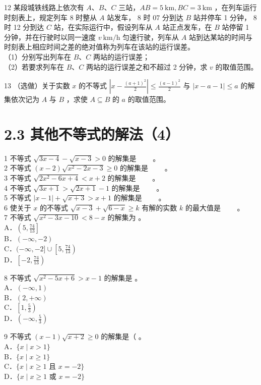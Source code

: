 \documentclass[10pt]{article}
\begin{document}
12 某段城铁线路上依次有 \(A 、 B 、 C\) 三站，\(A B=5 \mathrm{~km}, B C=3 \mathrm{~km}\) ，在列车运行时刻表上，规定列车 8 时整从 \(A\) 站发车， 8 时 07 分到达 \(B\) 站并停车 1 分钟， 8 时 12 分到达 \(C\) 站，在实际运行中，假设列车从 \(A\) 站正点发车，在 \(B\) 站停留 1 分钟，并在行驶时以同一速度 \(v \mathrm{~km} / \mathrm{h}\) 匀速行驶，列车从 \(A\) 站到达某站的时间与时刻表上相应时间之差的绝对值称为列车在该站的运行误差。\\
（1）分别写出列车在 \(B 、 C\) 两站的运行误差；\\
（2）若要求列车在 \(B 、 C\) 两站的运行误差之和不超过 2 分钟，求 \(v\) 的取值范围。

13 （选做）关于实数 \(x\) 的不等式 \(\left|x-\frac{(a+1)^{2}}{2}\right| \leqslant \frac{(a-1)^{2}}{2}\) 与 \(|x-a-1| \leqslant a\) 的解集依次记为 \(A\) 与 \(B\) ，求使 \(A \subseteq B\) 的 \(a\) 的取值范围。

\section*{2.3 其他不等式的解法（4）}
1 不等式 \(\sqrt{3 x-4}-\sqrt{x-3}>0\) 的解集是 \(\qquad\)。\\
2 不等式 \((x-2) \sqrt{x^{2}-2 x-3} \geqslant 0\) 的解集是 \(\qquad\)。\\
3 不等式 \(\sqrt{2 x^{2}-6 x+4}<x+2\) 的解集是 \(\qquad\)。\\
4 不等式 \(\sqrt{3 x+1}>\sqrt{2 x+1}-1\) 的解集是 \(\qquad\)。\\
5 不等式 \(|x-1|+\sqrt{x+3}>x+1\) 的解集是 \(\qquad\)。\\
6 使关于 \(x\) 的不等式 \(\sqrt{x-3}+\sqrt{6-x} \geqslant k\) 有解的实数 \(k\) 的最大值是 \(\qquad\)。\\
7 不等式 \(\sqrt{x^{2}-3 x-10}<8-x\) 的解集为 。\\
A．\(\left(5, \frac{74}{13}\right]\)\\
B．\((-\infty,-2)\)\\
C．\((-\infty,-2] \cup\left[5, \frac{74}{13}\right)\)\\
D．\(\left[-2, \frac{74}{13}\right)\)

8 不等式 \(\sqrt{x^{2}-5 x+6}>x-1\) 的解集是 。\\
A．\((-\infty, 1)\)\\
B．\((2,+\infty)\)\\
C．\(\left[1, \frac{5}{3}\right)\)\\
D．\(\left(-\infty, \frac{5}{3}\right)\)

9 不等式 \((x-1) \sqrt{x+2} \geqslant 0\) 的解集是（ 。\\
A．\(\{x \mid x>1\}\)\\
B．\(\{x \mid x \geqslant 1\}\)\\
C．\(\{x \mid x \geqslant 1\) 且 \(x=-2\}\)\\
D．\(\{x \mid x \geqslant 1\) 或 \(x=-2\}\)
\end{document}
